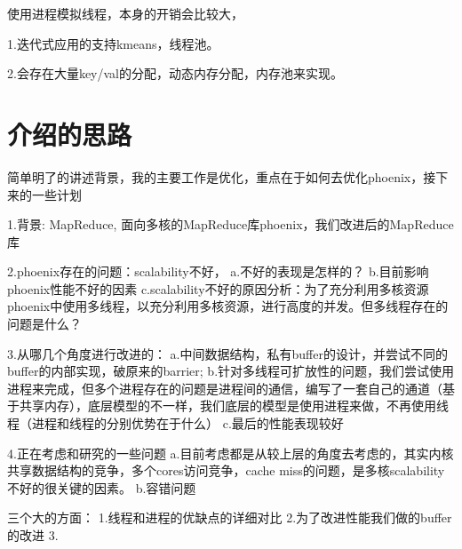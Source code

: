 使用进程模拟线程，本身的开销会比较大，

1.迭代式应用的支持kmeans，线程池。

2.会存在大量key/val的分配，动态内存分配，内存池来实现。

\section{介绍的思路}
简单明了的讲述背景，我的主要工作是优化，重点在于如何去优化phoenix，接下来的一些计划

1.背景: MapReduce, 面向多核的MapReduce库phoenix，我们改进后的MapReduce库

2.phoenix存在的问题：scalability不好，
a.不好的表现是怎样的？
b.目前影响phoenix性能不好的因素
c.scalability不好的原因分析：为了充分利用多核资源phoenix中使用多线程，以充分利用多核资源，进行高度的并发。但多线程存在的问题是什么？


3.从哪几个角度进行改进的：
a.中间数据结构，私有buffer的设计，并尝试不同的buffer的内部实现，破原来的barrier; 
b.针对多线程可扩放性的问题，我们尝试使用进程来完成，但多个进程存在的问题是进程间的通信，编写了一套自己的通道（基于共享内存），底层模型的不一样，我们底层的模型是使用进程来做，不再使用线程（进程和线程的分别优势在于什么）
c.最后的性能表现较好

4.正在考虑和研究的一些问题
a.目前考虑都是从较上层的角度去考虑的，其实内核共享数据结构的竞争，多个cores访问竞争，cache miss的问题，是多核scalability不好的很关键的因素。
b.容错问题

三个大的方面：
1.线程和进程的优缺点的详细对比
2.为了改进性能我们做的buffer的改进
3.



